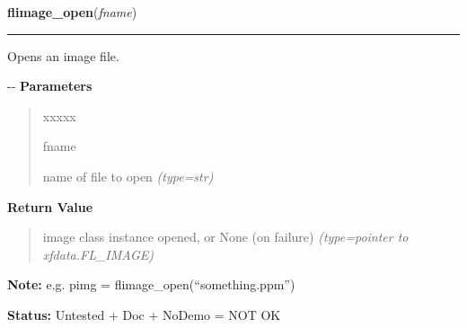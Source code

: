 \hspace{.8\funcindent}\begin{boxedminipage}{\funcwidth}

    \raggedright \textbf{flimage\_open}(\textit{fname})

    \vspace{-1.5ex}

    \rule{\textwidth}{0.5\fboxrule}
\setlength{\parskip}{2ex}

Opens an image file.

-{}-
\setlength{\parskip}{1ex}
      \textbf{Parameters}
      \vspace{-1ex}

      \begin{quote}
        \begin{Ventry}{xxxxx}

          \item[fname]


name of file to open
            {\it (type=str)}

        \end{Ventry}

      \end{quote}

      \textbf{Return Value}
    \vspace{-1ex}

      \begin{quote}

image class instance opened, or None (on failure)
      {\it (type=pointer to xfdata.FL\_IMAGE)}

      \end{quote}

\textbf{Note:} 
e.g. pimg = flimage\_open(``something.ppm'')


\textbf{Status:} 
Untested + Doc + NoDemo = NOT OK


    \end{boxedminipage}

    \label{xformslib:flflimage:flimage_read_annotation}

    \vspace{0.5ex}

